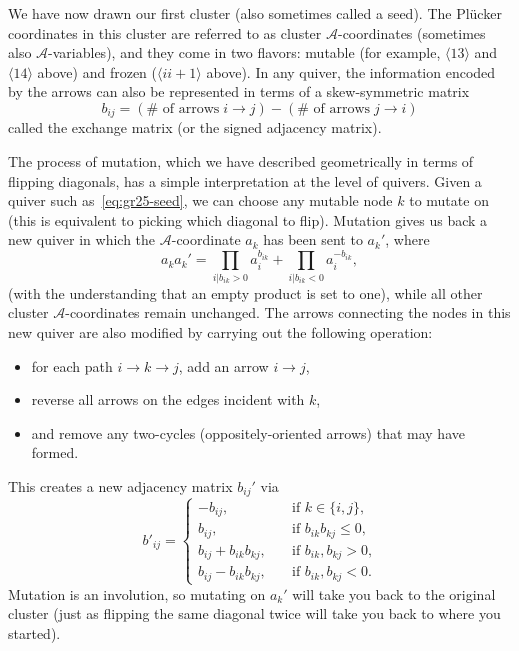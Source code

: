 \documentclass[11pt]{article}
\def\ket#1{\langle #1 \rangle}
\def\a{\mathcal{A}}
\begin{document}
We have now drawn our first cluster (also sometimes called a seed). The Pl\"ucker coordinates in this cluster are referred to as cluster $\a$-coordinates (sometimes also $\a$-variables), and they come in two flavors: mutable (for example, $\ket{13}$ and $\ket{14}$ above) and frozen ($\ket{ii+1}$ above). In any quiver, the information encoded by the arrows can also be represented in terms of a skew-symmetric matrix
\begin{equation}
b_{i j} = (\# \text{ of arrows}\; i \to j) - (\# \text{ of arrows}\; j \to i)
\label{eq:bijdef}
\end{equation}
called the exchange matrix (or the signed adjacency matrix).

The process of mutation, which we have described geometrically in terms of flipping diagonals, has a simple interpretation at the level of quivers. Given a quiver such as~\eqref{eq:gr25-seed}, we can choose any mutable node $k$ to mutate on (this is equivalent to picking which diagonal to flip). Mutation gives us back a new quiver in which the $\a$-coordinate $a_{k}$ has been sent to $a_{k}'$, where 
\begin{equation}
  \label{eq:a-coord-mutation}
  a_{k} a_{k}' = \prod_{i \vert b_{i k} > 0} a_{i}^{b_{i k}} + \prod_{i \vert b_{i k} < 0} a_{i}^{-b_{i k}},
\end{equation} (with the understanding that an empty product is set to one), while all other cluster $\a$-coordinates remain unchanged. The arrows connecting the nodes in this new quiver are also modified by carrying out the following operation:
\begin{itemize}
	\item for each path $i\to k \to j$, add an arrow $i\to j$,
	\item reverse all arrows on the edges incident with $k$,
	\item and remove any two-cycles (oppositely-oriented arrows) that may have formed.
\end{itemize}
This creates a new adjacency matrix $b_{ij}'$ via 
\begin{equation}
  \label{eq:b-mutation}
  b'_{i j} =
  \begin{cases}
    -b_{i j}, &\quad \text{if $k \in \lbrace i, j\rbrace$,}\\
    b_{i j}, &\quad \text{if $b_{i k} b_{k j} \leq 0$,}\\
    b_{i j} + b_{i k} b_{k j}, &\quad \text{if $b_{i k}, b_{k j} > 0$,}\\
    b_{i j} - b_{i k} b_{k j}, &\quad \text{if $b_{i k}, b_{k j} < 0$.}
  \end{cases}
\end{equation}
Mutation is an involution, so mutating on $a_k'$ will take you back to the original cluster (just as flipping the same diagonal twice will take you back to where you started). 
\end{document}
